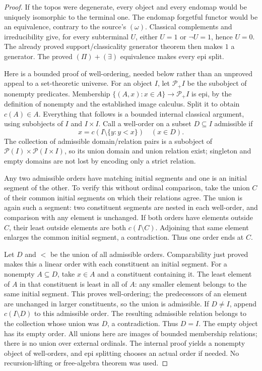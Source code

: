 \begin{proof}
If the topos were degenerate, every object and every endomap would be
uniquely isomorphic to the terminal one. The endomap forgetful functor
would be an equivalence, contrary to the source's \((\omega)\).
Classical complements and irreducibility give, for every subterminal
\(U\), either \(U=1\) or \(\neg U=1\), hence \(U=0\).
The already proved support/classicality generator theorem then makes
\(1\) a generator. The proved \((\Pi)+(\exists)\) equivalence
makes every epi split.

Here is a bounded proof of well-ordering, needed below rather than an
unproved appeal to a set-theoretic universe. For an object \(I\), let
\(\mathcal P_+I\) be the subobject of nonempty predicates. Membership
\(\{(A,x):x\in A\}\to\mathcal P_+I\) is epi, by the definition
of nonempty and the established image calculus. Split it to obtain
\(c(A)\in A\). Everything that follows is a bounded internal
classical argument, using subobjects of \(I\) and \(I\times I\).
Call a well-order on a subset \(D\subseteq I\) admissible if
\[
       x=c(I\setminus\{y:y<x\})\quad(x\in D).
\]
The collection of admissible domain/relation pairs is a subobject of
\(\mathcal P(I)\times\mathcal P(I\times I)\), so its union
domain and union relation exist; singleton and empty domains are not
lost by encoding only a strict relation.

Any two admissible orders have matching initial segments and one is
an initial segment of the other. To verify this without ordinal
comparison, take the union \(C\) of their common initial segments
on which their relations agree. The union is again such a segment:
two constituent segments are nested in each well-order, and comparison
with any element is unchanged. If both orders have elements outside
\(C\), their least outside elements are both \(c(I\setminus C)\).
Adjoining that same element enlarges the common initial segment, a
contradiction. Thus one order ends at \(C\).

Let \(D\) and \(<\) be the union of all admissible orders.
Comparability just proved makes this a linear order with each constituent
an initial segment. For a nonempty \(A\subseteq D\), take
\(x\in A\) and a constituent containing it. The least element of
\(A\) in that constituent is least in all of \(A\): any smaller
element belongs to the same initial segment. This proves well-ordering;
the predecessors of an element are unchanged in larger constituents,
so the union is admissible. If \(D\ne I\), append
\(c(I\setminus D)\) to this admissible order. The resulting
admissible relation belongs to the collection whose union was \(D\),
a contradiction. Thus \(D=I\). The empty object has its empty order.
All unions here are images of bounded membership relations; there is
no union over external ordinals. The internal proof yields a nonempty
object of well-orders, and epi splitting chooses an actual order if
needed. No recursion-lifting or free-algebra theorem was used.
\end{proof}

